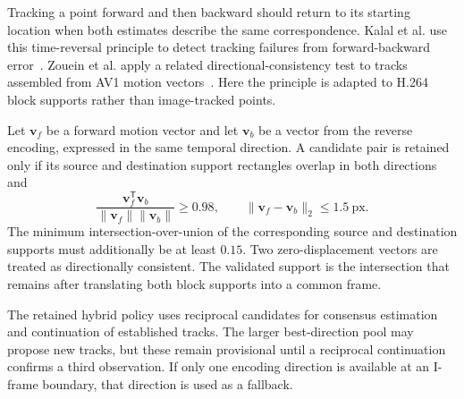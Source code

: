 Tracking a point forward and then backward should return to its starting location when both estimates describe the same correspondence. Kalal et al. use this time-reversal principle to detect tracking failures from forward-backward error~\cite{kalal2010forwardbackward}. Zouein et al. apply a related directional-consistency test to tracks assembled from AV1 motion vectors~\cite{zouein2025leveraging}. Here the principle is adapted to H.264 block supports rather than image-tracked points.

Let $\mathbf{v}_f$ be a forward motion vector and let $\mathbf{v}_b$ be a vector from the reverse encoding, expressed in the same temporal direction. A candidate pair is retained only if its source and destination support rectangles overlap in both directions and
\begin{equation}
  \frac{\mathbf{v}_f^{\mathsf T}\mathbf{v}_b}
       {\lVert\mathbf{v}_f\rVert\lVert\mathbf{v}_b\rVert}
  \geq 0.98,
  \qquad
  \lVert\mathbf{v}_f-\mathbf{v}_b\rVert_2 \leq 1.5\ \text{px}.
\end{equation}
The minimum intersection-over-union of the corresponding source and destination supports must additionally be at least $0.15$. Two zero-displacement vectors are treated as directionally consistent. The validated support is the intersection that remains after translating both block supports into a common frame.

The retained hybrid policy uses reciprocal candidates for consensus estimation and continuation of established tracks. The larger best-direction pool may propose new tracks, but these remain provisional until a reciprocal continuation confirms a third observation. If only one encoding direction is available at an I-frame boundary, that direction is used as a fallback.


